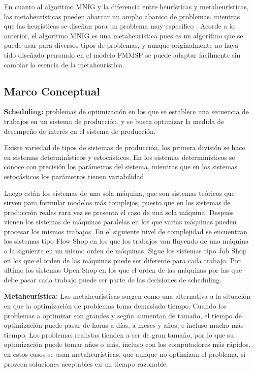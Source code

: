 \documentclass{article}
\begin{document}
\vspace{\baselineskip}
En cuanto al algoritmo MNIG y la diferencia entre heurísticas y 
metaheurísticas, las metaheurísticas pueden abarcar un amplio abanico de
problemas, mientras que las heurísticas se diseñan para un problema muy
específico \autocite{metaTalbi}. Acorde a lo anterior, el algoritmo MNIG
es una metaheurística pues es un algoritmo que se puede usar para diversos
tipos de problemas, y aunque originalmente no haya sido diseñado pensando
en el modelo FMMSP se puede adaptar fácilmente sin cambiar la esencia de
la metaheurística.

\subsection{Marco Conceptual}

\indent\indent
\textbf{Scheduling:} problemas de optimización en los que se establece una
secuencia de trabajos en un sistema de producción, y se busca optimizar la
medida de desempeño de interés en el sistema de producción.

\vspace{\baselineskip}
Existe variedad de tipos de sistemas de producción, los primera división se
hace en sistemas determinísticos y estocásticos. En los sistemas 
determinísticos se conoce con precisión los parámetros del sistema, mientras
que en los sistemas estocásticos los parámetros tienen 
variabilidad \autocite{schedPinedo}

\vspace{\baselineskip}
Luego están los sistemas de una sola máquina, que son sistemas teóricos que
sirven para formular modelos más complejos, puesto que en los sistemas de
producción reales rara vez se presenta el caso de una sola máquina. Después
vienen los sistemas de máquinas paralelas en los que varias máquinas pueden
procesar los mismos trabajos. En el siguiente nivel de complejidad se
encuentran los sistemas tipo Flow Shop en los que los trabajos van fluyendo
de una máquina a la siguiente en un mismo orden de máquinas. Sigue los
sistemas tipo Job Shop en los que el orden de las máquinas puede ser
diferente para cada trabajo. Por último los sistemas Open Shop en los que el
orden de las máquinas por las que debe pasar cada trabajo puede ser
parte de las decisiones de scheduling. \autocite{schedPinedo}

\vspace{\baselineskip}
\textbf{Metaheurística:} Las metaheurísticas surgen como una alternativa a la
\linebreak situación en que la optimización de problemas toma demasiado 
tiempo. Cuando
los problemas a optimizar son grandes y según aumentan de tamaño, el tiempo
de optimización puede pasar de horas a días, a meses y años, e incluso mucho
más tiempo. Los problemas realistas tienden a ser de gran tamaño, por lo que
su optimización puede tomar años o más, incluso con los computadores más
rápidos, en estos casos se usan 
metaheurísticas, que aunque no optimizan el problema, sí proveen soluciones
aceptables en un tiempo razonable. \autocite{metaTalbi}
\end{document}
